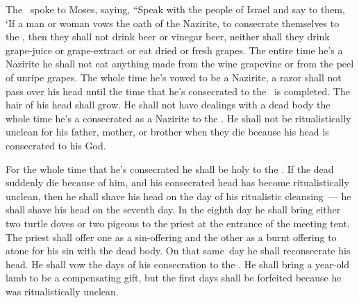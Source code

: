 
\begin{inparaenum}
   The \lord\ spoke to Moses, saying,%
   ``Speak with the people of Israel and say to them, `If a man or woman vows the oath of the Nazirite, to consecrate themselves to the \lord,%
   then they shall not drink beer or vinegar beer, neither shall they drink grape-juice or grape-extract or eat dried or fresh grapes.%
   The entire time he's a Nazirite he shall not eat anything made from the wine grapevine or from the peel of unripe grapes.%
   The whole time he's vowed to be a Nazirite, a razor shall not pass over his head until the time that he's consecrated to the \lord\ is completed. The hair of his head shall grow.%
   He shall not have dealings with a dead body the whole time he's a consecrated as a Nazirite to the \lord.%
   He shall not be ritualistically unclean for his father, mother, or brother when they die because his head is consecrated to his God.%
  
   For the whole time that he's consecrated he shall be holy to the \lord.%
   If the dead suddenly die because of him, and his consecrated head has become ritualistically unclean, then he shall shave his head on the day of his ritualistic cleansing~--- he shall shave his head on the seventh day.%
   In the eighth day he shall bring either two turtle doves or two pigeons to the priest at the entrance of the meeting tent.%
   The priest shall offer one as a sin-offering and the other as a burnt offering to atone for his sin with the dead body. On that same\understood\ day he shall reconsecrate his head.%
   He shall vow the days of his consecration to the \lord. He shall bring a year-old lamb to be a compensating gift, but the first days shall be forfeited because he was ritualistically unclean.%
  

\end{inparaenum}

